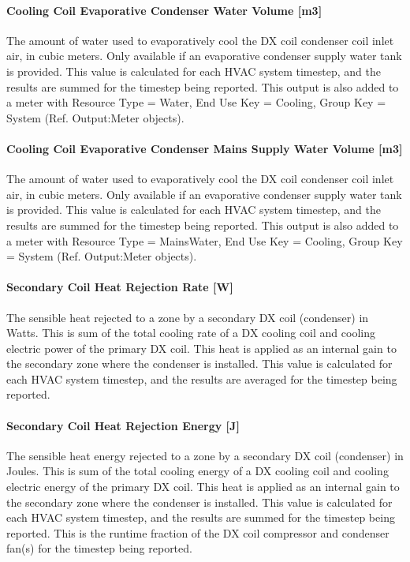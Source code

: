 \paragraph{Cooling Coil Evaporative Condenser Water Volume {[}m3{]}}

The amount of water used to evaporatively cool the DX coil condenser coil inlet air, in cubic meters. Only available if an evaporative condenser supply water tank is provided. This value is calculated for each HVAC system timestep, and the results are summed for the timestep being reported. This output is also added to a meter with Resource Type = Water, End Use Key = Cooling, Group Key = System (Ref. Output:Meter objects).

\paragraph{Cooling Coil Evaporative Condenser Mains Supply Water Volume {[}m3{]}}

The amount of water used to evaporatively cool the DX coil condenser coil inlet air, in cubic meters. Only available if an evaporative condenser supply water tank is provided. This value is calculated for each HVAC system timestep, and the results are summed for the timestep being reported. This output is also added to a meter with Resource Type = MainsWater, End Use Key = Cooling, Group Key = System (Ref. Output:Meter objects).

\paragraph{Secondary Coil Heat Rejection Rate {[}W{]}}

The sensible heat rejected to a zone by a secondary DX coil (condenser) in Watts. This is sum of the total cooling rate of a DX cooling coil and cooling electric power of the primary DX coil. This heat is applied as an internal gain to the secondary zone where the condenser is installed. This value is calculated for each HVAC system timestep, and the results are averaged for the timestep being reported.

\paragraph{Secondary Coil Heat Rejection Energy {[}J{]}}

The sensible heat energy rejected to a zone by a secondary DX coil (condenser) in Joules. This is sum of the total cooling energy of a DX cooling coil and cooling electric energy of the primary DX coil. This heat is applied as an internal gain to the secondary zone where the condenser is installed. This value is calculated for each HVAC system timestep, and the results are summed for the timestep being reported.
This is the runtime fraction of the DX coil compressor and condenser fan(s) for the timestep being reported.

